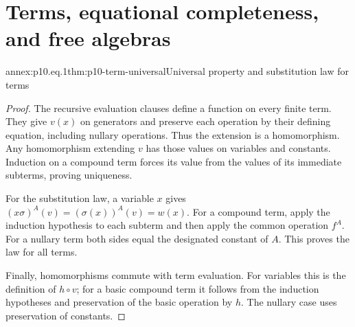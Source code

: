 
\section{Terms, equational completeness, and free algebras}

\begin{annexitem}{annex:p10.eq.1}{thm:p10-term-universal}{Universal property and substitution law for terms}
\begin{proof}
The recursive evaluation clauses define a function on every finite
term. They give \(v(x)\) on generators and preserve each operation
by their defining equation, including nullary operations.
Thus the extension is a homomorphism.
Any homomorphism extending \(v\) has those values on variables and
constants. Induction on a compound term forces its value from the
values of its immediate subterms, proving uniqueness.

For the substitution law, a variable \(x\) gives
\((x\sigma)^A(v)=(\sigma(x))^A(v)=w(x)\).
For a compound term, apply the induction hypothesis to each
subterm and then apply the common operation \(f^A\).
For a nullary term both sides equal the designated constant of \(A\).
This proves the law for all terms.

Finally, homomorphisms commute with term evaluation.
For variables this is the definition of \(h\circ v\); for a basic
compound term it follows from the induction hypotheses and
preservation of the basic operation by \(h\).
The nullary case uses preservation of constants.
\end{proof}
\end{annexitem}

